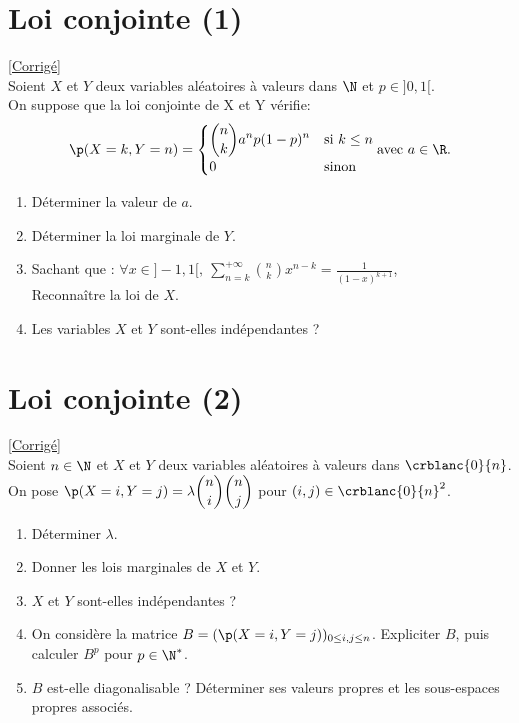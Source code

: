 \documentclass[8pt]{book}
\begin{document}
\section{Loi conjointe (1) }
\label{Loi conjointe 1}
\textcolor{blue}{\hyperref[Loi conjointe 1 corrigé]{[Corrigé]}}\\
Soient $X$ et $Y$ deux variables aléatoires à valeurs dans $\N$ et $p\in]0,1[$.
\\On suppose que la loi conjointe de X et Y vérifie:$$\p(X=k,Y=n)=\begin{cases} 
	\displaystyle\binom{n}{k}a^np(1-p)^n &\mbox{si } k\leq n \\
	0 &\mbox{sinon} 
\end{cases} \text{avec} \ a\in\R. $$ 
\begin{enumerate}
	\item Déterminer la valeur de $a$.
	\item Déterminer la loi marginale de $Y$.
	\item Sachant que : $\forall x\in]-1,1[,\ \displaystyle\sum\limits_{n=k}^{+\infty}\binom{n}{k}x^{n-k}=\frac{1}{(1-x)^{k+1}}$,\\Reconnaître la loi de $X$.
	\item Les variables $X$ et $Y$ sont-elles indépendantes ?
\end{enumerate}

\section{Loi conjointe (2) }
\label{Loi conjointe 2}
\textcolor{blue}{\hyperref[Loi conjointe 2 corrigé]{[Corrigé]}}\\
Soient $n\in\N$ et $X$ et $Y$ deux variables aléatoires à valeurs dans $\crblanc{0}{n}$. On pose $\p(X=i,Y=j)=\lambda \displaystyle\binom{n}{i}\binom{n}{j}$ pour $(i,j)\in\crblanc{0}{n}^2$.
\begin{enumerate}
	\item Déterminer $\lambda$.
	\item Donner les lois marginales de $X$ et $Y$.
	\item $X$ et $Y$ sont-elles indépendantes ?
	\item On considère la matrice $B=(\p(X=i,Y=j))_{0\leq i,j \leq n}$. Expliciter $B$, puis calculer $B^p$ pour $p\in\N^*$.
	\item $B$ est-elle diagonalisable ? Déterminer ses valeurs propres et les sous-espaces propres associés.
\end{enumerate}
\end{document}
